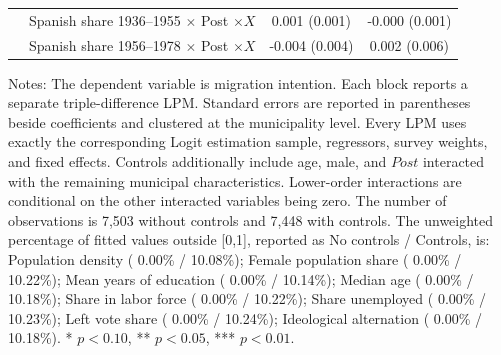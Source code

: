 \begin{table}[!htbp]
\begin{tabular}{llcc}
 & Spanish share 1936--1955 \(\times\) Post \(\times X\) & 0.001 (0.001) & -0.000 (0.001) \\
 & Spanish share 1956--1978 \(\times\) Post \(\times X\) & -0.004 (0.004) & 0.002 (0.006) \\
\hline
\end{tabular}
\par\vspace{1.5mm}
\begin{minipage}{0.98\linewidth}
\footnotesize\setlength{\parindent}{0pt}\setlength{\parskip}{1pt}
Notes: The dependent variable is migration intention. Each block reports a separate triple-difference LPM. Standard errors are reported in parentheses beside coefficients and clustered at the municipality level. Every LPM uses exactly the corresponding Logit estimation sample, regressors, survey weights, and fixed effects. Controls additionally include age, male, and \(Post\) interacted with the remaining municipal characteristics. Lower-order interactions are conditional on the other interacted variables being zero. The number of observations is        7,503 without controls and        7,448 with controls. The unweighted percentage of fitted values outside [0,1], reported as No controls / Controls, is: Population density ( 0.00\% / 10.08\%); Female population share ( 0.00\% / 10.22\%); Mean years of education ( 0.00\% / 10.14\%); Median age ( 0.00\% / 10.18\%); Share in labor force ( 0.00\% / 10.22\%); Share unemployed ( 0.00\% / 10.23\%); Left vote share ( 0.00\% / 10.24\%); Ideological alternation ( 0.00\% / 10.18\%). * \(p<0.10\), ** \(p<0.05\), *** \(p<0.01\).
\end{minipage}
\end{table}
